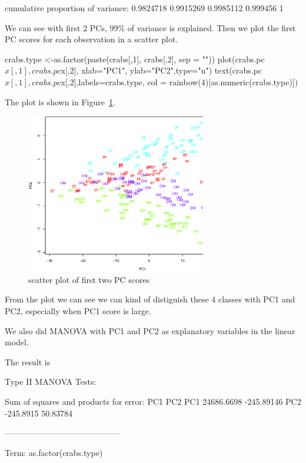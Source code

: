 \documentclass{article}
\begin{document}
\begin{enumerate}[leftmargin = 0 em, label = \arabic*., font = \bfseries]
\begin{enumerate}
\begin{rcode}
cumulative proportion of variance:  0.9824718 0.9915269 0.9985112 0.999456 1
\end{rcode}
We can see with first 2 PCs, 99\% of variance is explained. Then we plot the first PC scores for each observation in a scatter plot.
\begin{rcode}
   crabs.type <-as.factor(paste(crabs[,1], crabs[,2], sep = ""))
    plot(crabs.pc$x[,1],crabs.pc$x[,2],
          xlab="PC1",
          ylab="PC2",type="n")
    text(crabs.pc$x[,1],crabs.pc$x[,2],labels=crabs.type, col = rainbow(4)[as.numeric(crabs.type)])  
\end{rcode}
The plot is shown in Figure~\ref{pca}.
\begin{figure}[!htb]
	\centering
	\includegraphics[width = 0.7\textwidth]{pca.eps}
	\caption{scatter plot of first two PC scores}
	\label{pca}
\end{figure}
 From the plot we can see we can kind of distiguish these 4 classes with PC1 and PC2, especially when PC1 score is large.

 We also did MANOVA with PC1 and PC2 as explanatory variables in the linear model. 
 The result is
\begin{rcode}
Type II MANOVA Tests:

Sum of squares and products for error:
           PC1        PC2
PC1 24686.6698 -245.89146
PC2  -245.8915   50.83784

------------------------------------------
 
Term: as.factor(crabs.type) 


\end{rcode}
\end{enumerate}
\end{enumerate}
\end{document}
